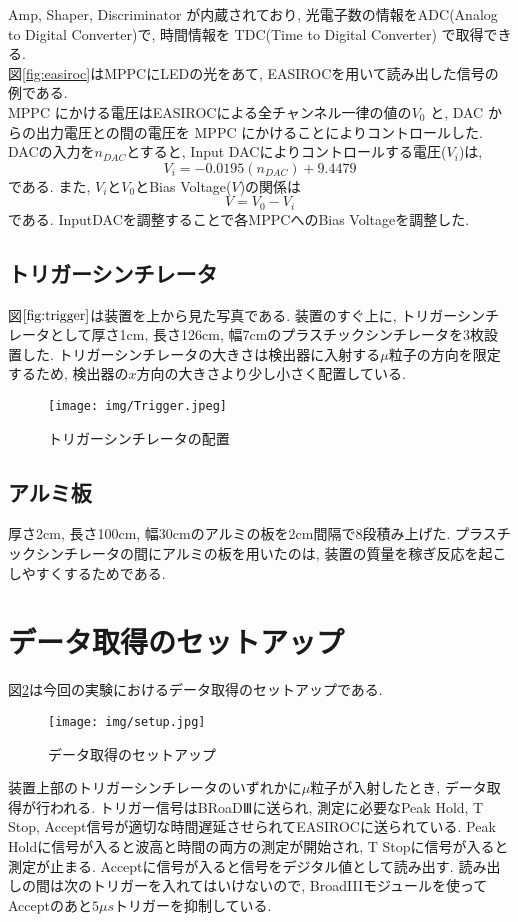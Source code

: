 Amp, Shaper, Discriminator が内蔵されており, 光電子数の情報をADC(Analog to Digital Converter)で, 時間情報を TDC(Time to Digital Converter) で取得できる.
\\
図\ref{fig:easiroc}はMPPCにLEDの光をあて, EASIROCを用いて読み出した信号の例である.
\\
MPPC にかける電圧はEASIROCによる全チャンネル一律の値の$V_0$ と, DAC からの出力電圧との間の電圧を MPPC にかけることによりコントロールした.
DACの入力を$n_{DAC}$とすると, Input DACによりコントロールする電圧($V_i$)は,
\begin{equation}
    V_i = -0.0195(n_{DAC}) + 9.4479
\end{equation}
である.
また, $V_i$と$V_0$とBias Voltage($V$)の関係は
\begin{equation}
    V = V_0 - V_i
\end{equation}
である.
InputDACを調整することで各MPPCへのBias Voltageを調整した.

\subsection{トリガーシンチレータ}
図$\ref{fig:trigger}$は装置を上から見た写真である.
装置のすぐ上に, トリガーシンチレータとして厚さ1cm, 長さ126cm, 幅7cmのプラスチックシンチレータを3枚設置した.
トリガーシンチレータの大きさは検出器に入射する$\mu$粒子の方向を限定するため, 検出器の$x$方向の大きさより少し小さく配置している.
\begin{figure}[H]
    \centering
    \texttt{[image: img/Trigger.jpeg]}
    \caption{トリガーシンチレータの配置}
    \label{fig:trigger}
\end{figure}

\subsection{アルミ板}
厚さ2cm, 長さ100cm, 幅30cmのアルミの板を2cm間隔で8段積み上げた.
プラスチックシンチレータの間にアルミの板を用いたのは, 装置の質量を稼ぎ反応を起こしやすくするためである.

\section{データ取得のセットアップ}
図\ref{fig:setup}は今回の実験におけるデータ取得のセットアップである.
\begin{figure}[H]
    \centering
    \texttt{[image: img/setup.jpg]}
    \caption{データ取得のセットアップ}
    \label{fig:setup}
\end{figure}
装置上部のトリガーシンチレータのいずれかに$\mu$粒子が入射したとき, データ取得が行われる.
トリガー信号はBRoaDⅢに送られ, 測定に必要なPeak Hold, T Stop, Accept信号が適切な時間遅延させられてEASIROCに送られている.
Peak Holdに信号が入ると波高と時間の両方の測定が開始され, T Stopに信号が入ると測定が止まる.
Acceptに信号が入ると信号をデジタル値として読み出す.
読み出しの間は次のトリガーを入れてはいけないので, BroadIIIモジュールを使ってAcceptのあと$5 \mu s$トリガーを抑制している.

